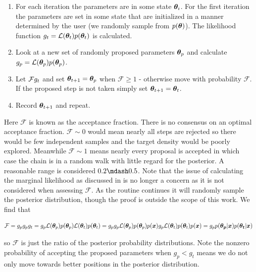 \begin{enumerate}
\item For each iteration the parameters are in some state $\boldsymbol{\theta}_i$.  For the first iteration the parameters are set
in some state that are initialized in a manner determined by the user (we randomly sample from $p(\boldsymbol{\theta})$).  The
likelihood function $g_t = \mathcal{L}(\boldsymbol{\theta}_t) p(\boldsymbol{\theta}_t)$ is calculated.
\item Look at a new set of randomly proposed parameters $\boldsymbol{\theta}_{p}$ and calculate 
$g_p = \mathcal{L}(\boldsymbol{\theta}_p) p(\boldsymbol{\theta}_p)$.
\item Let $\mathcal{F} \def \frac{g_p}{g_t}$ and set $\boldsymbol{\theta}_{t+1} = \boldsymbol{\theta}_p$ when
$\mathcal{F} \geq 1$ - otherwise move with probability $\mathcal{F}$.  If the proposed step is not taken simply set
$\boldsymbol{\theta}_{t+1} = \boldsymbol{\theta}_t$.
\item Record $\boldsymbol{\theta}_{t+1}$ and repeat.
\end{enumerate}

Here $\mathcal{F}$ is known as the acceptance fraction.  There is no consensus on an optimal acceptance fraction.  $\mathcal{F} {\sim} 0$
would mean nearly all steps are rejected so there would be few independent samples and the target density would be poorly
explored.  Meanwhile $\mathcal{F} {\sim} 1$ means nearly every proposal is accepted in which case the chain is in a random walk with
little regard for the posterior.  A reasonable range is considered $0.2 \mdash 0.5$.  Note that the issue of calculating the marginal
likelihood as discussed in
 is no longer a concern as it is not considered when assessing
$\mathcal{F}$.  As the routine continues it will randomly sample the posterior distribution, though the proof is outside the scope of this
work.  We find that

\begin{equation}
\mathcal{F} = \frac{g_p}{g_t} = \frac{\mathcal{L}(\vect{\theta}_p) p(\vect{\theta}_p)}
{\mathcal{L}(\vect{\theta}_t) p(\vect{\theta}_t)} = 
\frac{\frac{\mathcal{L}(\vect{\theta}_p) p(\vect{\theta}_p)}{p(\vect{x})}}
{\frac{\mathcal{L}(\vect{\theta}_t) p(\vect{\theta}_t)}{p(\vect{x})}} =
\frac{p(\vect{\theta_p}|\vect{x})}{p(\vect{\theta_t}|\vect{x})}
\label{eq:er_nr_calibrations_parameter_determ_mcmc_acc_ratio}
\end{equation}

\noindent so $\mathcal{F}$ is just the ratio of the posterior probability distributions.  Note the nonzero probability of accepting the
proposed parameters when $g_p < g_t$ means we do not only move towards better positions in the posterior distribution.

